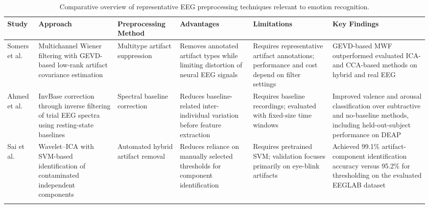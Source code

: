 \documentclass[ASNA,twocolumn]{USG}
\newcommand{\lightrowsep}{%
  \arrayrulecolor{lightrowgray}%
  \specialrule{0.30pt}{3.5pt}{3.5pt}%
  \arrayrulecolor{black}%
}
\begin{document}
\begin{table}[tp]
\centering
\small
\setlength{\tabcolsep}{2pt}
\renewcommand{\arraystretch}{1.07}

\caption{Comparative overview of representative EEG preprocessing techniques relevant to emotion recognition.}
\label{tab:eeg_preprocessing_summary}

\begin{tabular}{
>{\raggedright\arraybackslash}p{}
>{\raggedright\arraybackslash}p{}
>{\raggedright\arraybackslash}p{}
>{\raggedright\arraybackslash}p{}
>{\raggedright\arraybackslash}p{}
>{\raggedright\arraybackslash}p{}
}

\toprule
\textbf{Study} &
\textbf{Approach} &
\textbf{Preprocessing Method} &
\textbf{Advantages} &
\textbf{Limitations} &
\textbf{Key Findings} \\
\midrule

Somers et al.~\cite{somers2018generic} &
Multichannel Wiener filtering with
GEVD-based low-rank artifact
covariance estimation &
Multitype artifact suppression &
Removes annotated artifact types
while limiting distortion of
neural EEG signals &
Requires representative artifact
annotations; performance and cost
depend on filter settings &
GEVD-based MWF outperformed
evaluated ICA- and CCA-based
methods on hybrid and real EEG \\
\lightrowsep

Ahmed et al.~\cite{ahmed2023novel} &
InvBase correction through inverse
filtering of trial EEG spectra
using resting-state baselines &
Spectral baseline correction &
Reduces baseline-related
inter-individual variation
before feature extraction &
Requires baseline recordings;
evaluated with fixed-size
time windows &
Improved valence and arousal
classification over subtractive
and no-baseline methods, including
held-out-subject performance
on DEAP \\
\lightrowsep

Sai et al.~\cite{sai2017automated} &
Wavelet--ICA with SVM-based
identification of contaminated
independent components &
Automated hybrid artifact removal &
Reduces reliance on manually
selected thresholds for
component identification &
Requires pretrained SVM;
validation focuses primarily
on eye-blink artifacts &
Achieved 99.1\% artifact-component
identification accuracy versus
95.2\% for thresholding on
the evaluated EEGLAB dataset \\
\lightrowsep


\end{tabular}
\end{table}
\end{document}

